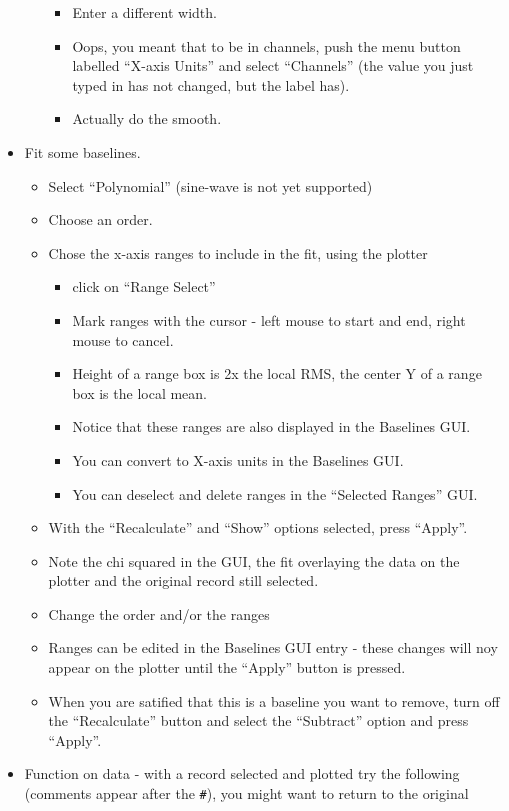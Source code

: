 \begin{itemize}
\begin{itemize}
\begin{itemize}
\item Enter a different width.
\item Oops, you meant that to be in channels, push the menu button
labelled ``X-axis Units'' and select ``Channels'' (the value you just
typed in has not changed, but the label has).
\item Actually do the smooth.
\end{itemize}
\end{itemize}
\item Fit some baselines.
\begin{itemize}
\item Select ``Polynomial'' (sine-wave is not yet supported)
\item Choose an order.
\item Chose the x-axis ranges to include in the fit, using the plotter
\begin{itemize}
\item click on ``Range Select''
\item Mark ranges with the cursor - left mouse to start and end, right
mouse to cancel.
\item Height of a range box is 2x the local RMS, the center Y of a 
range box is the local mean.
\item Notice that these ranges are also displayed in the Baselines GUI.
\item You can convert to X-axis units in the Baselines GUI.
\item You can deselect and delete ranges in the ``Selected Ranges'' GUI.
\end{itemize}
\item With the ``Recalculate'' and ``Show'' options selected, press ``Apply''.
\item Note the chi squared in the GUI, the fit overlaying the data on the 
plotter and the original record still selected.
\item Change the order and/or the ranges
\item Ranges can be edited in the Baselines GUI entry - these changes will
noy appear on the plotter until the ``Apply'' button is pressed.
\item When you are satified that this is a baseline you want to remove,
turn off the ``Recalculate'' button and select the ``Subtract'' option
and press ``Apply''.
\end{itemize}
\item Function on data - with a record selected and plotted try the following
(comments appear after the \verb_#_), you might want to return to the original

\end{itemize}
